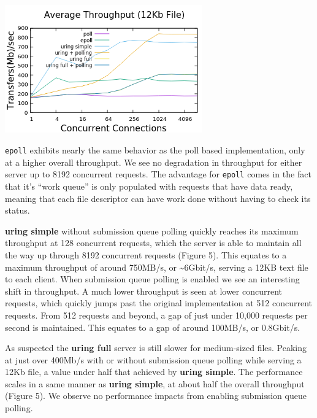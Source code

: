 \documentclass[conference]{IEEEtran}{}
\begin{document}
\begin{center}
\includegraphics[width=3.35in]{med_throughput.png}
\end{center}

\texttt{epoll} exhibits nearly the same behavior as the poll based implementation, only at a higher overall throughput. We see no degradation in throughput for either server up to 8192 concurrent requests. The advantage for \texttt{epoll} comes in the fact that it's ``work queue'' is only populated with requests that have data ready, meaning that each file descriptor can have work done without having to check its status.

\textbf{uring simple} without submission queue polling quickly reaches its maximum throughput at 128 concurrent requests, which the server is able to maintain all the way up through 8192 concurrent requests (Figure 5). This equates to a maximum throughput of around 750MB/s, or \textasciitilde{}6Gbit/s, serving a 12KB text file to each client. When submission queue polling is enabled we see an interesting shift in throughput. A much lower throughput is seen at lower concurrent requests, which quickly jumps past the original implementation at 512 concurrent requests. From 512 requests and beyond, a gap of just under 10,000 requests per second is maintained. This equates to a gap of around 100MB/s, or 0.8Gbit/s.

As suspected the \textbf{uring full} server is still slower for medium-sized files. Peaking at just over 400Mb/s with or without submission queue polling while serving a 12Kb file, a value under half that achieved by \textbf{uring simple}. The performance scales in a same manner as \textbf{uring simple}, at about half the overall throughput (Figure 5). We observe no performance impacts from enabling submission queue polling.
\end{document}
